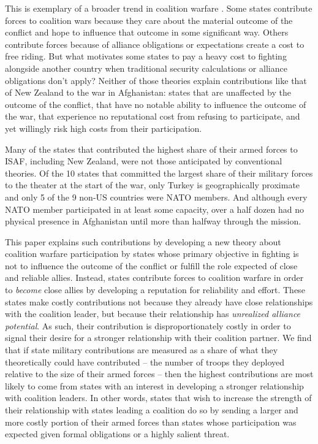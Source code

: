 \documentclass[12pt,letterpaper]{article}
\begin{document}
	This is exemplary of a broader trend in coalition warfare \citep{vonhlatky_greatasymmetryamerica_2010}. Some states contribute forces to coalition wars because they care about the material outcome of the conflict and hope to influence that outcome in some significant way. Others contribute forces because of alliance obligations or expectations create a cost to free riding. But what motivates some states to pay a heavy cost to fighting alongside another country when traditional security calculations or alliance obligations don't apply? Neither of those theories explain contributions like that of New Zealand to the war in Afghanistan: states that are unaffected by the outcome of the conflict, that have no notable ability to influence the outcome of the war, that experience no reputational cost from refusing to participate, and yet willingly risk high costs from their participation.
	
	Many of the states that contributed the highest share of their armed forces to ISAF, including New Zealand, were not those anticipated by conventional theories. Of the 10 states that committed the largest share of their military forces to the theater at the start of the war, only Turkey is geographically proximate and only 5 of the 9 non-US countries were NATO members. And although every NATO member participated in at least some capacity, over a half dozen had no physical presence in Afghanistan until more than halfway through the mission.

	This paper explains such contributions by developing a new theory about coalition warfare participation by states whose primary objective in fighting is not to influence the outcome of the conflict or fulfill the role expected of close and reliable allies. Instead, states contribute forces to coalition warfare in order to \textit{become} close allies by developing a reputation for reliability and effort. These states make costly contributions not because they already have close relationships with the coalition leader, but because their relationship has \textit{unrealized alliance potential}. As such, their contribution is disproportionately costly in order to signal their desire for a stronger relationship with their coalition partner. We find that if state military contributions are measured as a share of what they theoretically could have contributed -- the number of troops they deployed relative to the size of their armed forces -- then the highest contributions are most likely to come from states with an interest in developing a stronger relationship with coalition leaders. In other words, states that wish to increase the strength of their relationship with states leading a coalition do so by sending a larger and more costly portion of their armed forces than states whose participation was expected given formal obligations or a highly salient threat.
	
\end{document}

